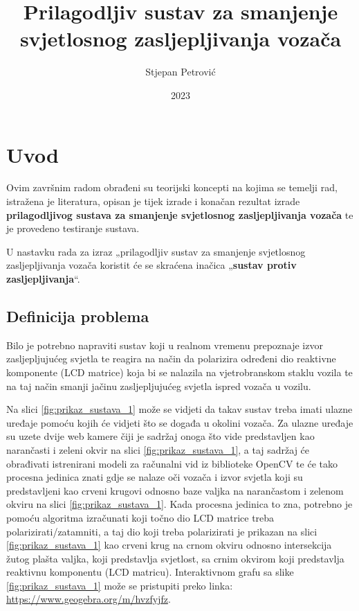 \documentclass{foi}
\title{Prilagodljiv sustav za smanjenje svjetlosnog zasljepljivanja vozača}
\author{Stjepan Petrović}
\date{2023}
\begin{document}
\justifying



\maketitle

\tableofcontents

\pagestyle{plain}
\chapter{Uvod}

Ovim završnim radom obrađeni su teorijski koncepti na kojima se temelji rad, istražena je literatura, opisan je tijek izrade i konačan rezultat izrade \textbf{prilagodljivog sustava za smanjenje svjetlosnog zasljepljivanja vozača} te je provedeno testiranje sustava.

U nastavku rada za izraz „prilagodljiv sustav za smanjenje svjetlosnog zasljepljivanja vozača koristit će se skraćena inačica „\textbf{sustav protiv zasljepljivanja}“.

\section{Definicija problema}

 Bilo je potrebno napraviti sustav koji u realnom vremenu prepoznaje izvor zasljepljujućeg svjetla te reagira na način da polarizira određeni dio reaktivne komponente (LCD matrice) koja bi se nalazila na vjetrobranskom staklu vozila te na taj način smanji jačinu zasljepljujućeg svjetla ispred vozača u vozilu.

 Na slici \ref{fig:prikaz_sustava_1} može se vidjeti da takav sustav treba imati ulazne uređaje pomoću kojih će vidjeti što se događa u okolini vozača. Za ulazne uređaje su uzete dvije web kamere čiji je sadržaj onoga što vide predstavljen kao narančasti i zeleni okvir na slici \ref{fig:prikaz_sustava_1}, a taj sadržaj će obrađivati istrenirani modeli za računalni vid iz biblioteke OpenCV te će tako procesna jedinica znati gdje se nalaze oči vozača i izvor svjetla koji su predstavljeni kao crveni krugovi odnosno baze valjka na narančastom i zelenom okviru na slici \ref{fig:prikaz_sustava_1}. Kada procesna jedinica to zna, potrebno je pomoću algoritma izračunati koji točno dio LCD matrice treba polarizirati/zatamniti, a taj dio koji treba polarizirati je prikazan na slici \ref{fig:prikaz_sustava_1} kao crveni krug na crnom okviru odnosno intersekcija žutog plašta valjka, koji predstavlja svjetlost, sa crnim okvirom koji predstavlja reaktivnu komponentu (LCD matricu). Interaktivnom grafu sa slike \ref{fig:prikaz_sustava_1} može se pristupiti preko linka: \url{https://www.geogebra.org/m/hvzfyjfz}.
\end{document}
